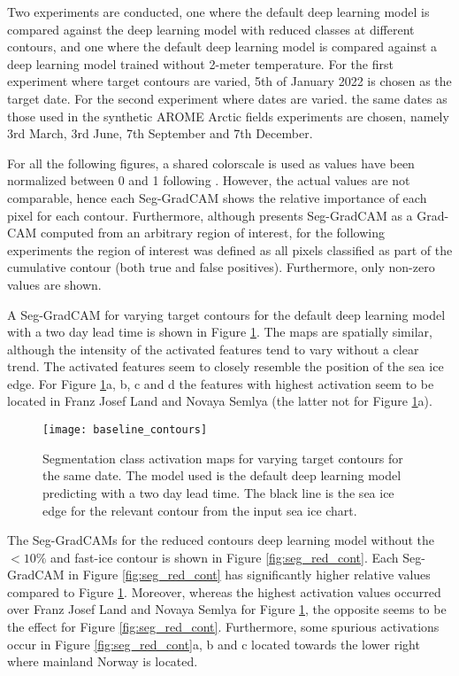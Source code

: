 \documentclass[../main/thesis.tex]{subfiles}
\begin{document}
Two experiments are conducted, one where the default deep learning model is compared against the deep learning model with reduced classes at different contours, and one where the default deep learning model is compared against a deep learning model trained without 2-meter temperature. For the first experiment where target contours are varied, 5th of January 2022 is chosen as the target date. For the second experiment where dates are varied. the same dates as those used in the synthetic AROME Arctic fields experiments are chosen, namely 3rd March, 3rd June, 7th September and 7th December. 

For all the following figures, a shared colorscale is used as values have been normalized between 0 and 1 following \citet{Vinogradova2020}. However, the actual values are not comparable, hence each Seg-GradCAM shows the relative importance of each pixel for each contour. Furthermore, although \citet{Vinogradova2020} presents Seg-GradCAM as a Grad-CAM computed from an arbitrary region of interest, for the following experiments the region of interest was defined as all pixels classified as part of the cumulative contour (both true and false positives). Furthermore, only non-zero values are shown.

A Seg-GradCAM for varying target contours for the default deep learning model with a two day lead time is shown in Figure \ref{fig:seg_base_cont}. The maps are spatially similar, although the intensity of the activated features tend to vary without a clear trend. The activated features seem to closely resemble the position of the sea ice edge. For Figure \ref{fig:seg_base_cont}a, b, c and d the features with highest activation seem to be located in Franz Josef Land and Novaya Semlya (the latter not for Figure \ref{fig:seg_base_cont}a). 

\begin{figure}
    \centering
    \texttt{[image: baseline\_contours]}
    \caption{\label{fig:seg_base_cont}Segmentation class activation maps for varying target contours for the same date. The model used is the default deep learning model predicting with a two day lead time. The black line is the sea ice edge for the relevant contour from the input sea ice chart.}
\end{figure}

The Seg-GradCAMs for the reduced contours deep learning model without the $<10\%$ and fast-ice contour is shown in Figure \ref{fig:seg_red_cont}. Each Seg-GradCAM in Figure \ref{fig:seg_red_cont} has significantly higher relative values compared to Figure \ref{fig:seg_base_cont}. Moreover, whereas the highest activation values occurred over Franz Josef Land and Novaya Semlya for Figure \ref{fig:seg_base_cont}, the opposite seems to be the effect for Figure \ref{fig:seg_red_cont}. Furthermore, some spurious activations occur in Figure \ref{fig:seg_red_cont}a, b and c located towards the lower right where mainland Norway is located.
\end{document}
